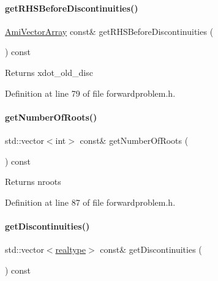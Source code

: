 \paragraph{\texorpdfstring{getRHSBeforeDiscontinuities()}{getRHSBeforeDiscontinuities()}}
{\footnotesize\ttfamily \mbox{\hyperlink{classamici_1_1_ami_vector_array}{Ami\+Vector\+Array}} const\& get\+R\+H\+S\+Before\+Discontinuities (\begin{DoxyParamCaption}{ }\end{DoxyParamCaption}) const}

\begin{DoxyReturn}{Returns}
xdot\+\_\+old\+\_\+disc 
\end{DoxyReturn}


Definition at line 79 of file forwardproblem.\+h.

\mbox{\label{classamici_1_1_forward_problem_ac5b41527ea8caadc2484221795a9e94f}} 
\paragraph{\texorpdfstring{getNumberOfRoots()}{getNumberOfRoots()}}
{\footnotesize\ttfamily std\+::vector$<$int$>$ const\& get\+Number\+Of\+Roots (\begin{DoxyParamCaption}{ }\end{DoxyParamCaption}) const}

\begin{DoxyReturn}{Returns}
nroots 
\end{DoxyReturn}


Definition at line 87 of file forwardproblem.\+h.

\mbox{\label{classamici_1_1_forward_problem_abe84b94f1305622d5b143081992d495b}} 
\paragraph{\texorpdfstring{getDiscontinuities()}{getDiscontinuities()}}
{\footnotesize\ttfamily std\+::vector$<$\mbox{\hyperlink{namespaceamici_a1bdce28051d6a53868f7ccbf5f2c14a3}{realtype}}$>$ const\& get\+Discontinuities (\begin{DoxyParamCaption}{ }\end{DoxyParamCaption}) const}

